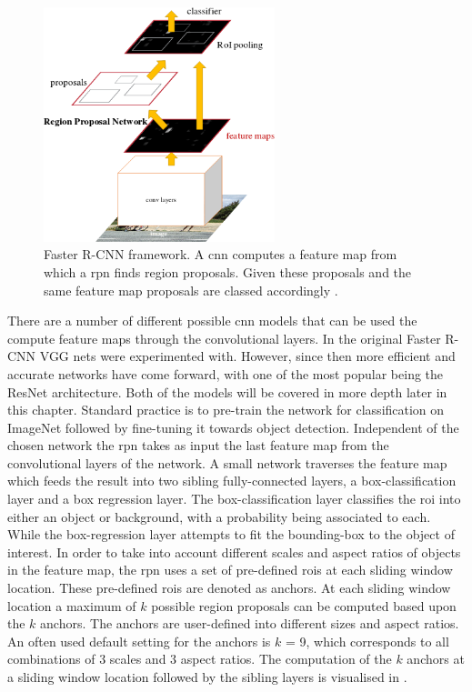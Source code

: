 \begin{figure}[H]
  \centering
    \includegraphics[width=0.6\textwidth]{Figs/Techanal/fasterframework.png}
      \caption{Faster R-CNN framework. A \gls{cnn} computes a feature map from which a \gls{rpn} finds region proposals. Given these proposals and the same feature map proposals are classed accordingly \cite{fasterrccn}.}
    \label{fig:fasterframework}
\end{figure}

There are a number of different possible \gls{cnn} models that can be used the compute feature maps through the convolutional layers. In the original Faster R-CNN VGG nets \cite{vgg16} were experimented with. However, since then more efficient and accurate networks have come forward, with one of the most popular being the ResNet \cite{deepres} architecture. Both of the models will be covered in more depth later in this chapter. Standard practice is to pre-train the network for classification on ImageNet followed by fine-tuning it towards object detection. Independent of the chosen network the \gls{rpn} takes as input the last feature map from the convolutional layers of the network. A small network traverses the feature map which feeds the result into two sibling fully-connected layers, a box-classification layer and a box regression layer. The box-classification layer classifies the \gls{roi} into either an object or background, with a probability being associated to each. While the box-regression layer attempts to fit the bounding-box to the object of interest. In order to take into account different scales and aspect ratios of objects in the feature map, the \gls{rpn} uses a set of pre-defined \glspl{roi} at each sliding window location. These pre-defined \glspl{roi} are denoted as anchors. At each sliding window location a maximum of $k$ possible region proposals can be computed based upon the $k$ anchors. The anchors are user-defined into different sizes and aspect ratios. An often used default setting for the anchors is $k$ = 9, which corresponds to all combinations of 3 scales and 3 aspect ratios. The computation of the $k$ anchors at a sliding window location followed by the sibling layers is visualised in .

